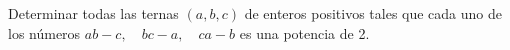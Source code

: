 Determinar todas las ternas $(a,b,c)$ de enteros positivos tales que cada uno de los números $ab-c, \quad bc-a,\quad ca-b$
es una potencia de 2.